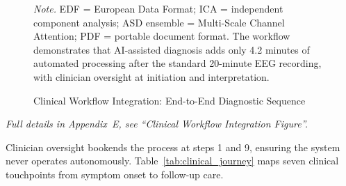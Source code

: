 \begin{figure}[!htbp]
{%
    }
    \caption[Clinical Workflow Integration]{Clinical Workflow Integration: End-to-End Diagnostic Sequence}
    \label{fig:clinical_workflow}
    \vspace{0.5em}\noindent\textit{Note.} EDF = European Data Format; ICA = independent component analysis; ASD ensemble = Multi-Scale Channel Attention; PDF = portable document format. The workflow demonstrates that AI-assisted diagnosis adds only 4.2 minutes of automated processing after the standard 20-minute EEG recording, with clinician oversight at initiation and interpretation.
\end{figure}
\fi
\noindent\textit{Full details in Appendix~E, see ``Clinical Workflow Integration Figure''.}


\noindent Clinician oversight bookends the process at steps 1 and 9, ensuring the system never operates autonomously. Table~\ref{tab:clinical_journey} maps seven clinical touchpoints from symptom onset to follow-up care.

